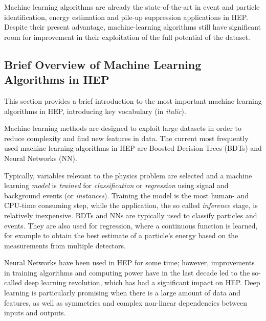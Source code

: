Machine learning algorithms are already the state-of-the-art in event and particle identification, energy estimation and pile-up suppression applications in HEP. Despite their present advantage, machine-learning algorithms still have significant room for improvement in their exploitation of the full potential of the dataset.


\subsection{Brief Overview of Machine Learning Algorithms in HEP}

This section provides a brief introduction to the most important machine learning algorithms in HEP, introducing key vocabulary (in \textit{italic}).


Machine learning methods are designed to exploit large datasets in order to reduce complexity and find new features in data. The current most frequently used machine learning algorithms in HEP are Boosted Decision Trees (BDTs) and Neural Networks (NN).

Typically, variables relevant to the physics problem are selected and a machine learning \textit{model} is \textit{trained} for \textit{classification} or \textit{regression} using signal and background events (or \textit{instances}).
Training the model is the most human- and CPU-time consuming step, while the application, the so called \textit{inference} stage, is relatively inexpensive.
BDTs and NNs are typically used to classify particles and events.
They are also used for regression, where a continuous function is learned, for example to obtain the best estimate of a particle's energy based on the measurements from multiple detectors.

Neural Networks have been used in HEP for some time; however, improvements in training algorithms and computing power have in the last decade led to the so-called deep learning
revolution, which has had a significant impact on HEP. Deep learning is particularly promising when there is a large amount of data and features, as well as symmetries and complex non-linear dependencies between inputs and outputs.


